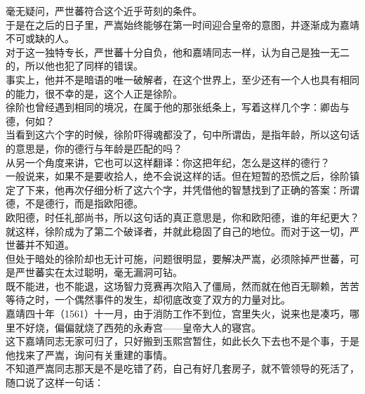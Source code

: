 \begin{multicols}{\theparacolNo}
毫无疑问，严世蕃符合这个近乎苛刻的条件。\\

于是在之后的日子里，严嵩始终能够在第一时间迎合皇帝的意图，并逐渐成为嘉靖不可或缺的人。\\

对于这一独特专长，严世蕃十分自负，他和嘉靖同志一样，认为自己是独一无二的，所以他也犯了同样的错误。\\

事实上，他并不是暗语的唯一破解者，在这个世界上，至少还有一个人也具有相同的能力，很不幸的是，这个人正是徐阶。\\

徐阶也曾经遇到相同的境况，在属于他的那张纸条上，写着这样几个字：卿齿与德，何如？\\

当看到这六个字的时候，徐阶吓得魂都没了，句中所谓齿，是指年龄，所以这句话的意思是，你的德行与年龄是匹配的吗？\\

从另一个角度来讲，它也可以这样翻译：你这把年纪，怎么是这样的德行？\\

一般说来，如果不是要收拾人，绝不会说这样的话。但在短暂的恐慌之后，徐阶镇定了下来，他再次仔细分析了这六个字，并凭借他的智慧找到了正确的答案：所谓德，不是德行，而是指欧阳德。\\

欧阳德，时任礼部尚书，所以这句话的真正意思是，你和欧阳德，谁的年纪更大？\\

就这样，徐阶成为了第二个破译者，并就此稳固了自己的地位。而对于这一切，严世蕃并不知道。\\

但处于暗处的徐阶却也无计可施，问题很明显，要解决严嵩，必须除掉严世蕃，可是严世蕃实在太过聪明，毫无漏洞可钻。\\

既不能进，也不能退，这场智力竞赛再次陷入了僵局，然而就在他百无聊赖，苦苦等待之时，一个偶然事件的发生，却彻底改变了双方的力量对比。\\

嘉靖四十年（1561）十一月，由于消防工作不到位，宫里失火，说来也是凑巧，哪里不好烧，偏偏就烧了西苑的永寿宫——皇帝大人的寝宫。\\

这下嘉靖同志无家可归了，只好搬到玉熙宫暂住，如此长久下去也不是个事，于是他找来了严嵩，询问有关重建的事情。\\

不知道严嵩同志那天是不是吃错了药，自己有好几套房子，就不管领导的死活了，随口说了这样一句话：\\


\end{multicols}
